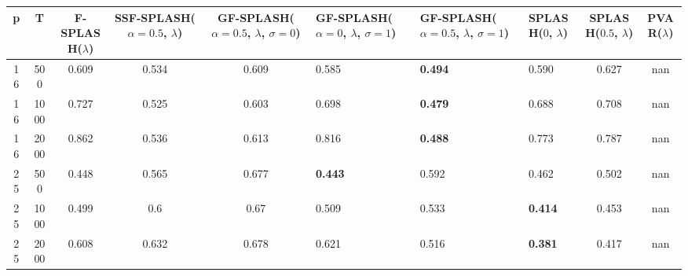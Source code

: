 \begin{tabular}{ccccclllcc}
\hline
  p  &  T   &  F-SPLASH($\lambda$)  &  SSF-SPLASH($\alpha=0.5$, $\lambda$)  &  GF-SPLASH($\alpha=0.5$, $\lambda$, $\sigma=0$)  & GF-SPLASH($\alpha=0$, $\lambda$, $\sigma=1$)   & GF-SPLASH($\alpha=0.5$, $\lambda$, $\sigma=1$)   & SPLASH($0$, $\lambda$)   &  SPLASH($0.5$, $\lambda$)  &  PVAR($\lambda$)  \\
\hline
 16  & 500  &         0.609         &                 0.534                 &                      0.609                       & 0.585                                          & \textbf{0.494}                                   & 0.590                    &           0.627            &        nan        \\
 16  & 1000 &         0.727         &                 0.525                 &                      0.603                       & 0.698                                          & \textbf{0.479}                                   & 0.688                    &           0.708            &        nan        \\
 16  & 2000 &         0.862         &                 0.536                 &                      0.613                       & 0.816                                          & \textbf{0.488}                                   & 0.773                    &           0.787            &        nan        \\
 25  & 500  &         0.448         &                 0.565                 &                      0.677                       & \textbf{0.443}                                 & 0.592                                            & 0.462                    &           0.502            &        nan        \\
 25  & 1000 &         0.499         &                  0.6                  &                       0.67                       & 0.509                                          & 0.533                                            & \textbf{0.414}           &           0.453            &        nan        \\
 25  & 2000 &         0.608         &                 0.632                 &                      0.678                       & 0.621                                          & 0.516                                            & \textbf{0.381}           &           0.417            &        nan        \\
\hline
\end{tabular}